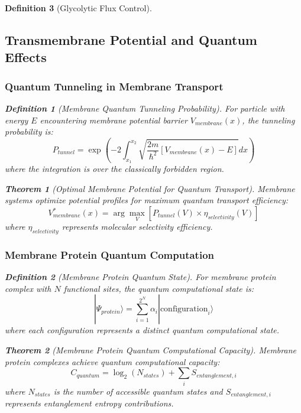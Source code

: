 \documentclass[12pt,a4paper]{article}
\newtheorem{theorem}{Theorem}
\newtheorem{definition}{Definition}
\begin{document}
\begin{definition}[Glycolytic Flux Control]
\subsection{Transmembrane Potential and Quantum Effects}

\subsubsection{Quantum Tunneling in Membrane Transport}

\begin{definition}[Membrane Quantum Tunneling Probability]
For particle with energy $E$ encountering membrane potential barrier $V_{membrane}(x)$, the tunneling probability is:
\begin{equation}
P_{tunnel} = \exp\left(-2 \int_{x_1}^{x_2} \sqrt{\frac{2m}{\hbar^2}[V_{membrane}(x) - E]} dx\right)
\end{equation}
where the integration is over the classically forbidden region.
\end{definition}

\begin{theorem}[Optimal Membrane Potential for Quantum Transport]
Membrane systems optimize potential profiles for maximum quantum transport efficiency:
\begin{equation}
V_{membrane}^*(x) = \arg\max_{V} \left[ P_{tunnel}(V) \times \eta_{selectivity}(V) \right]
\end{equation}
where $\eta_{selectivity}$ represents molecular selectivity efficiency.
\end{theorem}

\subsubsection{Membrane Protein Quantum Computation}

\begin{definition}[Membrane Protein Quantum State]
For membrane protein complex with $N$ functional sites, the quantum computational state is:
\begin{equation}
|\Psi_{protein}\rangle = \sum_{i=1}^{2^N} \alpha_i |\text{configuration}_i\rangle
\end{equation}
where each configuration represents a distinct quantum computational state.
\end{definition}

\begin{theorem}[Membrane Protein Quantum Computational Capacity]
Membrane protein complexes achieve quantum computational capacity:
\begin{equation}
C_{quantum} = \log_2(N_{states}) + \sum_{i} S_{entanglement,i}
\end{equation}
where $N_{states}$ is the number of accessible quantum states and $S_{entanglement,i}$ represents entanglement entropy contributions.
\end{theorem}


\end{definition}
\end{document}
